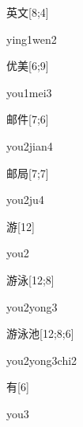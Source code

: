 \begin{verbete}{英文}[8;4]
\begin{pronuncia}{ying1wen2}
\end{pronuncia}
\end{verbete}

\begin{verbete}{优美}[6;9]
\begin{pronuncia}{you1mei3}
\end{pronuncia}
\end{verbete}

\begin{verbete}{邮件}[7;6]
\begin{pronuncia}{you2jian4}
\end{pronuncia}
\end{verbete}

\begin{verbete}[you2ju4]{邮局}[7;7]
\begin{pronuncia}{you2ju4}
\end{pronuncia}
\end{verbete}

\begin{verbete}[you2]{游}[12]
\begin{pronuncia}{you2}
\end{pronuncia}
\end{verbete}

\begin{verbete}{游泳}[12;8]
\begin{pronuncia}{you2yong3}
\end{pronuncia}
\end{verbete}

\begin{verbete}{游泳池}[12;8;6]
\begin{pronuncia}{you2yong3chi2}
\end{pronuncia}
\end{verbete}

\begin{verbete}[you3]{有}[6]
\begin{pronuncia}{you3}
\end{pronuncia}
\end{verbete}

